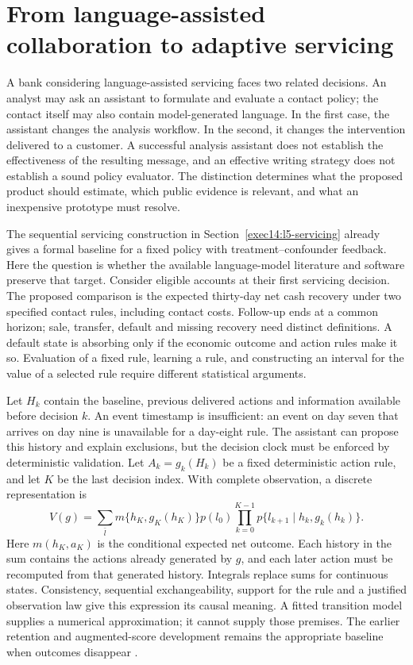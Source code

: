 \section{From language-assisted collaboration to adaptive servicing}
\label{exec16:longitudinal-policy}

A bank considering language-assisted servicing faces two related decisions.
An analyst may ask an assistant to formulate and evaluate a contact policy;
the contact itself may also contain model-generated language. In the first
case, the assistant changes the analysis workflow. In the second, it changes
the intervention delivered to a customer. A successful analysis assistant
does not establish the effectiveness of the resulting message, and an
effective writing strategy does not establish a sound policy evaluator.
The distinction determines what the proposed product should estimate, which
public evidence is relevant, and what an inexpensive prototype must resolve.

The sequential servicing construction in
Section~\ref{exec14:l5-servicing} already gives a formal baseline for a
fixed policy with treatment--confounder feedback.
Here the question is whether the available language-model literature and
software preserve that target. Consider eligible accounts at their first
servicing decision. The proposed comparison is the expected thirty-day net
cash recovery under two specified contact rules, including contact costs.
Follow-up ends at a common horizon; sale, transfer, default and missing
recovery need distinct definitions. A default state is absorbing only if
the economic outcome and action rules make it so. Evaluation of a fixed
rule, learning a rule, and constructing an interval for the value of a
selected rule require different statistical arguments.

Let $H_k$ contain the baseline, previous delivered actions and information
available before decision $k$. An event timestamp is insufficient: an event
on day seven that arrives on day nine is unavailable for a day-eight rule.
The assistant can propose this history and explain exclusions, but the
decision clock must be enforced by deterministic validation.
Let $A_k=g_k(H_k)$ be a fixed deterministic action rule, and let $K$ be the
last decision index. With complete observation, a discrete representation is
\begin{equation}
 V(g)=
 \sum_{\bar l}
 m\{h_K,g_K(h_K)\}p(l_0)
 \prod_{k=0}^{K-1}
 p\{l_{k+1}\mid h_k,g_k(h_k)\}.
 \label{eq:exec16-policy-recursion}
\end{equation}
Here $m(h_K,a_K)$ is the conditional expected net outcome. Each history in
the sum contains the actions already generated by $g$, and each later action
must be recomputed from that generated history. Integrals replace sums for
continuous states. Consistency, sequential exchangeability, support for the
rule and a justified observation law give this expression its causal
meaning. A fitted transition model supplies a numerical approximation; it
cannot supply those premises. The earlier retention and augmented-score
development remains the appropriate baseline when outcomes disappear
\citep{hernan2020}.

